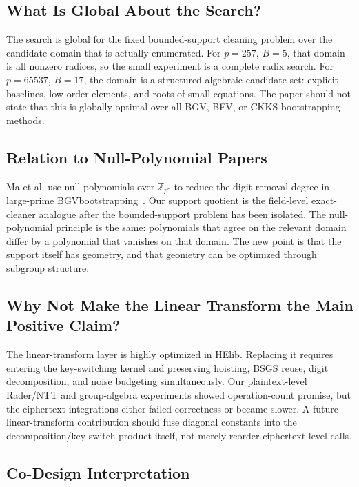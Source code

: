 \documentclass[a4paper,runningheads]{llncs}
\newcommand{\ZZ}{\mathbb{Z}}
\newcommand{\HElib}{\textsf{HElib}}
\newcommand{\BGV}{\textsf{BGV}}
\newcommand{\BFV}{\textsf{BFV}}
\newcommand{\CKKS}{\textsf{CKKS}}
\begin{document}
\subsection{What Is Global About the Search?}

The search is global for the fixed bounded-support cleaning problem over the
candidate domain that is actually enumerated. For $p=257$, $B=5$, that domain is
all nonzero radices, so the small experiment is a complete radix search. For
$p=65537$, $B=17$, the domain is a structured algebraic candidate set: explicit
baselines, low-order elements, and roots of small equations. The paper should
not state that this is globally optimal over all \BGV, \BFV, or \CKKS
bootstrapping methods.

\subsection{Relation to Null-Polynomial Papers}

Ma et al. use null polynomials over $\ZZ_{p^e}$ to reduce the digit-removal
degree in large-prime \BGV bootstrapping~\cite{ma_large_p}. Our support quotient
is the field-level exact-cleaner analogue after the bounded-support problem has
been isolated. The null-polynomial principle is the same: polynomials that
agree on the relevant domain differ by a polynomial that vanishes on that
domain. The new point is that the support itself has geometry, and that
geometry can be optimized through subgroup structure.

\subsection{Why Not Make the Linear Transform the Main Positive Claim?}

The linear-transform layer is highly optimized in \HElib. Replacing it requires
entering the key-switching kernel and preserving hoisting, BSGS reuse, digit
decomposition, and noise budgeting simultaneously. Our plaintext-level
Rader/NTT and group-algebra experiments showed operation-count promise, but the
ciphertext integrations either failed correctness or became slower. A future
linear-transform contribution should fuse diagonal constants into the
decomposition/key-switch product itself, not merely reorder ciphertext-level
calls.

\subsection{Co-Design Interpretation}
\end{document}
